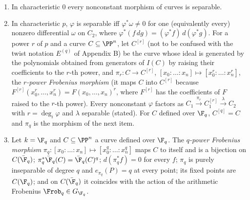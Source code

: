 \begin{proposition}\label{prop:curves:separability-frobenius}
\leavevmode
\begin{enumerate}[label=(\alph*)]
\item In characteristic $0$ every nonconstant morphism of curves is separable.
\item In characteristic $p$, $\varphi$ is separable iff $\varphi^*\omega\ne0$ for one (equivalently every) nonzero differential $\omega$ on $C_2$, where
$\varphi^*(f\,dg)=(\varphi^*f)\,d(\varphi^*g)$. For a power $r$ of $p$ and a curve $C\subseteq\PP^n$, let $C^{[r]}$ (not to be confused with the twist notation $E^{(q)}$ of Appendix B) be the curve whose ideal is generated by the polynomials obtained from generators of $I(C)$ by raising
their coefficients to the $r$-th power, and $\pi_r\colon C\to C^{[r]}$, $[x_0:\dots:x_n]\mapsto[x_0^r:\dots:x_n^r]$, the \emph{$r$-power Frobenius morphism} (it maps $C$ into $C^{[r]}$
because $F^{[r]}(x_0^r,\dots,x_n^r)=F(x_0,\dots,x_n)^r$, where $F^{[r]}$ has the coefficients of $F$ raised to the $r$-th power). Every nonconstant $\varphi$ factors as $C_1\xrightarrow{\pi_r}C_1^{[r]}\xrightarrow{\lambda}C_2$ with $r=\deg_i\varphi$ and $\lambda$
separable (stated). For $C$ defined over $\F_q$, $C^{[q]}=C$ and $\pi_q$ is the morphism of the next item.
\item Let $k=\F_q$ and $C\subseteq\PP^n$ a curve defined over $\F_q$. The \emph{$q$-power Frobenius morphism} $\pi_q\colon[x_0:\dots:x_n]\mapsto[x_0^q:\dots:x_n^q]$ maps $C$ to
itself and is a bijection on $C(\bar\F_q)$; $\pi_q^*\bar\F_q(C)=\bar\F_q(C)^q$; $d(\pi_q^*f)=0$ for every $f$; $\pi_q$ is purely inseparable of degree $q$ and
$e_{\pi_q}(P)=q$ at every point; its fixed points are $C(\F_q)$; and on $C(\bar\F_q)$ it coincides with the action of the arithmetic Frobenius $\Frob_q\in G_{\F_q}$.
\end{enumerate}
\end{proposition}

